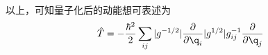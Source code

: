 \begin{note}
\begin{equation}
\begin{aligned}
\end{aligned}\end{equation}
以上，可知量子化后的动能想可表述为
\begin{equation}
	\hat{T} = -\frac{\hbar^2}{2} \sum_{ij} |g^{-1/2}| \frac{\partial}{\partial \q_i} |g^{1/2}| g^{-1}_{ij} \frac{\partial}{\partial \q_{j}}
\end{equation}
\end{note}




